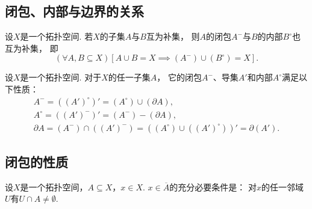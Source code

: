 \subsection{闭包、内部与边界的关系}
\begin{theorem}\label{theorem:拓扑学.内部与闭包的联系}
设\(X\)是一个拓扑空间.
若\(X\)的子集\(A\)与\(B\)互为补集，
则\(A\)的闭包\(A^-\)与\(B\)的内部\(B^\circ\)也互为补集，
即\[
	(\forall A,B \subseteq X)[A \cup B = X \implies (A^-) \cup (B^\circ) = X].
\]
\end{theorem}

\begin{theorem}
设\(X\)是一个拓扑空间.
对于\(X\)的任一子集\(A\)，
它的闭包\(A^-\)、导集\(A'\)和内部\(A^\circ\)满足以下性质：\begin{gather*}
	A^-
	= ((A')^\circ)'
	= (A^\circ) \cup (\partial A), \\
	A^\circ
	= ((A')^-)'
	= (A^-) - (\partial A), \\
	\partial A
	= (A^-) \cap ((A')^-)
	= ((A^\circ) \cup ((A')^\circ))'
	= \partial(A').
\end{gather*}
\end{theorem}

\subsection{闭包的性质}
\begin{proposition}\label{theorem:拓扑学.一点属于闭包的充分必要条件}
设\(X\)是一个拓扑空间，\(A \subseteq X\)，\(x \in X\).
\(x \in \overline{A}\)的充分必要条件是：
对\(x\)的任一邻域\(U\)有\(U \cap A \neq \emptyset\).
\end{proposition}


